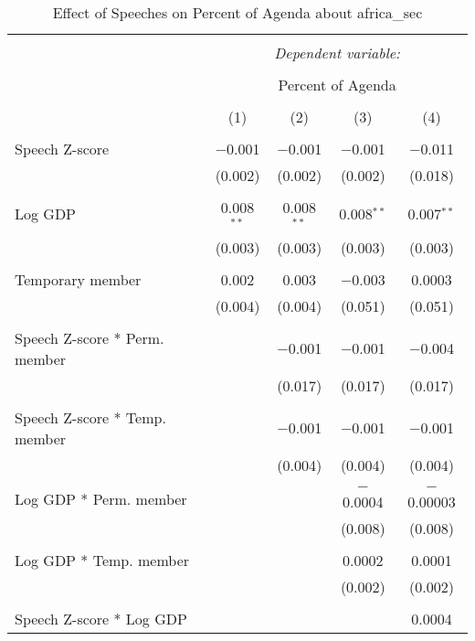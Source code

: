 
\begin{table}[!htbp] \centering 
  \caption{Effect of Speeches on Percent of Agenda about africa_sec} 
  \label{} 
\begin{tabular}{@{\extracolsep{5pt}}lcccc} 
\\[-1.8ex]\hline 
\hline \\[-1.8ex] 
 & \multicolumn{4}{c}{\textit{Dependent variable:}} \\ 
\cline{2-5} 
\\[-1.8ex] & \multicolumn{4}{c}{Percent of Agenda} \\ 
\\[-1.8ex] & (1) & (2) & (3) & (4)\\ 
\hline \\[-1.8ex] 
 Speech Z-score & $-$0.001 & $-$0.001 & $-$0.001 & $-$0.011 \\ 
  & (0.002) & (0.002) & (0.002) & (0.018) \\ 
  & & & & \\ 
 Log GDP & 0.008$^{**}$ & 0.008$^{**}$ & 0.008$^{**}$ & 0.007$^{**}$ \\ 
  & (0.003) & (0.003) & (0.003) & (0.003) \\ 
  & & & & \\ 
 Temporary member & 0.002 & 0.003 & $-$0.003 & 0.0003 \\ 
  & (0.004) & (0.004) & (0.051) & (0.051) \\ 
  & & & & \\ 
 Speech Z-score * Perm. member &  & $-$0.001 & $-$0.001 & $-$0.004 \\ 
  &  & (0.017) & (0.017) & (0.017) \\ 
  & & & & \\ 
 Speech Z-score * Temp. member &  & $-$0.001 & $-$0.001 & $-$0.001 \\ 
  &  & (0.004) & (0.004) & (0.004) \\ 
  & & & & \\ 
 Log GDP * Perm. member &  &  & $-$0.0004 & $-$0.00003 \\ 
  &  &  & (0.008) & (0.008) \\ 
  & & & & \\ 
 Log GDP * Temp. member &  &  & 0.0002 & 0.0001 \\ 
  &  &  & (0.002) & (0.002) \\ 
  & & & & \\ 
 Speech Z-score * Log GDP &  &  &  & 0.0004 \\ 

\end{tabular}
\end{table}
